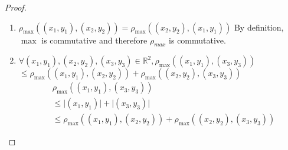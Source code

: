 \documentclass{article}
\begin{document}
\begin{enumerate}
\begin{proof}
\begin{enumerate}
                        \item $\rho_{\max}((x_1,y_1),(x_2,y_2)) = \rho_{\max}((x_2,y_2),(x_1,y_1))$
                              \medbreak
                              By definition, $\max$ is commutative and therefore $\rho_{max}$ is commutative.
                        \item $\forall(x_1,y_1),(x_2,y_2),(x_3,y_3)\in\mathbb{R}^2,\rho_{\max}((x_1,y_1),(x_3,y_3))$\\
                              \phantom{tabbing}$\leq \rho_{\max}((x_1,y_1),(x_2,y_2))+\rho_{\max}((x_2,y_2),(x_3,y_3))$
                              \begin{align*}
                                     & \rho_{\max}((x_1,y_1),(x_3,y_3))                                       \\
                                     & \leq \lvert(x_1,y_1)\rvert + \lvert(x_3,y_3)\rvert                     \\
                                     & \leq \rho_{\max}((x_1,y_1),(x_2,y_2))+\rho_{\max}((x_2,y_2),(x_3,y_3))
                              \end{align*}


\end{enumerate}
\end{proof}
\end{enumerate}
\end{document}
